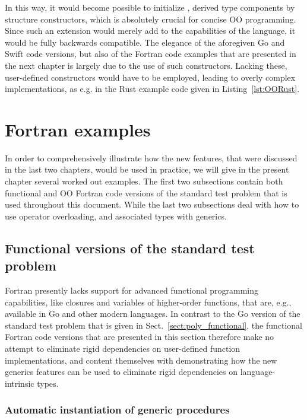 \documentclass[11pt,oneside]{report}
\newcommand{\code}[1]{{\selectfont\ttfamily{#1}}}
\begin{document}
In this way, it would become possible to initialize \code{private},
\code{allocatable} derived type components by structure constructors,
which is absolutely crucial for concise OO programming. Since such an
extension would merely add to the capabilities of the language, it
would be fully backwards compatible. The elegance of the aforegiven
Go and Swift code versions, but also of the Fortran code examples that
are presented in the next chapter is largely due to the use of such
constructors. Lacking these, user-defined constructors would have to
be employed, leading to overly complex implementations, as e.g. in the
Rust example code given in Listing~\ref{lst:OORust}.


\chapter{Fortran examples}
\label{chapt:fortran_examples}

In order to comprehensively illustrate how the new features, that were
discussed in the last two chapters, would be used in practice, we will
give in the present chapter several worked out examples. The first two
subsections contain both functional and OO Fortran code versions of
the standard test problem that is used throughout this document. While
the last two subsections deal with how to use operator overloading, and
associated types with generics.

\section{Functional versions of the standard test problem}

Fortran presently lacks support for advanced functional programming
capabilities, like closures and variables of higher-order functions,
that are, e.g., available in Go and other modern languages. In
contrast to the Go version of the standard test problem that is given
in Sect.~\ref{sect:poly_functional}, the functional Fortran code
versions that are presented in this section therefore make no attempt
to eliminate rigid dependencies on user-defined function
implementations, and content themselves with demonstrating how the new
generics features can be used to eliminate rigid dependencies on
language-intrinsic types.

\subsection{Automatic instantiation of generic procedures}
\end{document}

